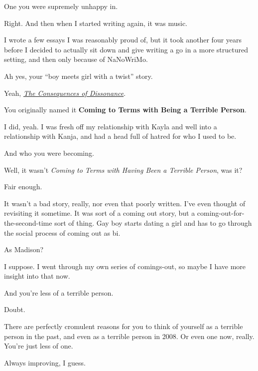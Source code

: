\begin{ally}
One you were supremely unhappy in.
\end{ally}
Right. And then when I started writing again, it was music.

I wrote a few essays I was reasonably proud of, but it took another four years before I decided to actually sit down and give writing a go in a more structured setting, and then only because of NaNoWriMo.

\begin{ally}
Ah yes, your ``boy meets girl with a twist'' story.
\end{ally}
Yeah, \href{https://writing.drab-makyo.com/fiction/consequences-of-dissonance/}{\emph{The Consequences of Dissonance}}.

\begin{ally}
You originally named it \textbf{Coming to Terms with Being a Terrible Person}.
\end{ally}
I did, yeah. I was fresh off my relationship with Kayla and well into a relationship with Kanja, and had a head full of hatred for who I used to be.

\begin{ally}
And who you were becoming.
\end{ally}
Well, it wasn't \emph{Coming to Terms with Having Been a Terrible Person}, was it?

\begin{ally}
Fair enough.
\end{ally}
It wasn't a bad story, really, nor even that poorly written. I've even thought of revisiting it sometime. It was sort of a coming out story, but a coming-out-for-the-second-time sort of thing. Gay boy starts dating a girl and has to go through the social process of coming out as bi.

\begin{ally}
As Madison?
\end{ally}
I suppose. I went through my own series of comings-out, so maybe I have more insight into that now.

\begin{ally}
And you're less of a terrible person.
\end{ally}
Doubt.

\begin{ally}
There are perfectly cromulent reasons for you to think of yourself as a terrible person in the past, and even as a terrible person in 2008. Or even one now, really. You're just less of one.
\end{ally}
Always improving, I guess.


